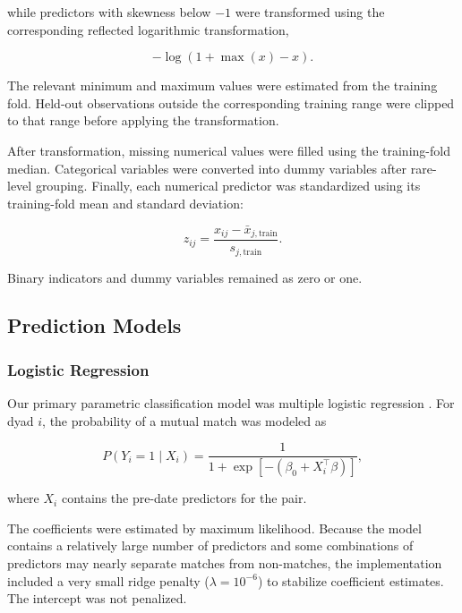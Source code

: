 while predictors with skewness below $-1$ were transformed using the corresponding reflected logarithmic transformation,

\begin{equation}
-\log(1+\max(x)-x).
\end{equation}

The relevant minimum and maximum values were estimated from the training fold. Held-out observations outside the corresponding training range were clipped to that range before applying the transformation.

After transformation, missing numerical values were filled using the training-fold median. Categorical variables were converted into dummy variables after rare-level grouping. Finally, each numerical predictor was standardized using its training-fold mean and standard deviation:

\begin{equation}
z_{ij}
=
\frac{
x_{ij}-\bar{x}_{j,\mathrm{train}}
}{
s_{j,\mathrm{train}}
}.
\end{equation}

Binary indicators and dummy variables remained as zero or one.


\subsection{Prediction Models}

\subsubsection{Logistic Regression}

Our primary parametric classification model was multiple logistic regression \cite[Equation 4.7, p.~142]{James:2023}. For dyad $i$, the probability of a mutual match was modeled as

\begin{equation}
P(Y_i=1\mid X_i)
=
\frac{1}
{1+\exp\left[-(\beta_0 + X_i^\top\beta)\right]},
\end{equation}

where $X_i$ contains the pre-date predictors for the pair.

The coefficients were estimated by maximum likelihood. Because the model contains a relatively large number of predictors and some combinations of predictors may nearly separate matches from non-matches, the implementation included a very small ridge penalty ($\lambda=10^{-6}$) to stabilize coefficient estimates. The intercept was not penalized.

